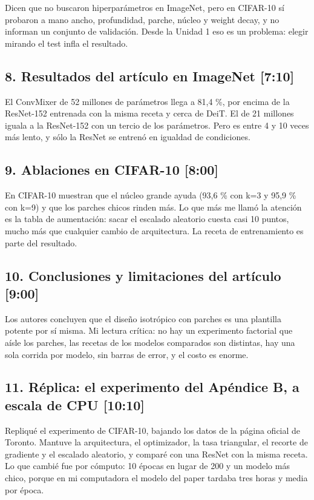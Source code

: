 \documentclass[11pt,a4paper]{article}
\begin{document}
Dicen que no buscaron hiperparámetros en ImageNet, pero en CIFAR-10 sí probaron a mano ancho, profundidad, parche, núcleo y weight decay, y no informan un conjunto de validación. Desde la Unidad 1 eso es un problema: elegir mirando el test infla el resultado.

\subsection{8. Resultados del artículo en ImageNet \hfill \normalfont\small [7:10]}
El ConvMixer de 52 millones de parámetros llega a 81,4 \%, por encima de la ResNet-152 entrenada con la misma receta y cerca de DeiT. El de 21 millones iguala a la ResNet-152 con un tercio de los parámetros. Pero es entre 4 y 10 veces más lento, y sólo la ResNet se entrenó en igualdad de condiciones.

\subsection{9. Ablaciones en CIFAR-10 \hfill \normalfont\small [8:00]}
En CIFAR-10 muestran que el núcleo grande ayuda (93,6 \% con k=3 y 95,9 \% con k=9) y que los parches chicos rinden más. Lo que más me llamó la atención es la tabla de aumentación: sacar el escalado aleatorio cuesta casi 10 puntos, mucho más que cualquier cambio de arquitectura. La receta de entrenamiento es parte del resultado.

\subsection{10. Conclusiones y limitaciones del artículo \hfill \normalfont\small [9:00]}
Los autores concluyen que el diseño isotrópico con parches es una plantilla potente por sí misma. Mi lectura crítica: no hay un experimento factorial que aísle los parches, las recetas de los modelos comparados son distintas, hay una sola corrida por modelo, sin barras de error, y el costo es enorme.

\subsection{11. Réplica: el experimento del Apéndice B, a escala de CPU \hfill \normalfont\small [10:10]}
Repliqué el experimento de CIFAR-10, bajando los datos de la página oficial de Toronto. Mantuve la arquitectura, el optimizador, la tasa triangular, el recorte de gradiente y el escalado aleatorio, y comparé con una ResNet con la misma receta. Lo que cambié fue por cómputo: 10 épocas en lugar de 200 y un modelo más chico, porque en mi computadora el modelo del paper tardaba tres horas y media por época.
\end{document}
